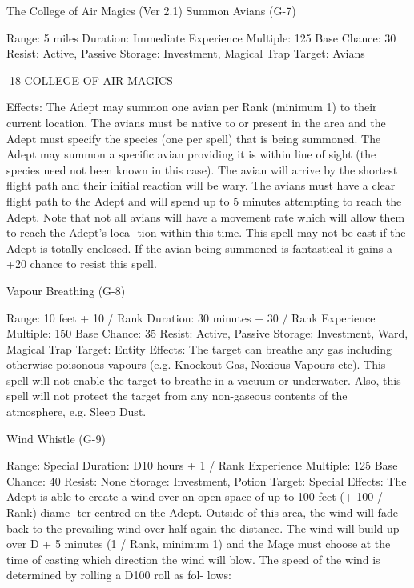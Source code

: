 \begin{Chapter}{The College of Air Magics (Ver 2.1)}
Summon Avians (G-7) 

Range: 5 miles 
Duration: Immediate 
Experience Multiple: 125 
Base Chance: 30%
Resist: Active, Passive 
Storage: Investment, Magical Trap 
Target: Avians 

18 COLLEGE OF AIR MAGICS 

Effects:  The  Adept  may  summon  one  avian  per 
Rank  (minimum  1)  to  their  current  location.  The 
avians must be native to or present in the area and 
the  Adept  must  specify  the  species  (one  per  spell) 
that is being summoned. The Adept may summon a 
specific  avian  providing  it  is  within  line  of  sight 
(the species need not been known in this case). The 
avian  will  arrive  by  the  shortest  flight  path  and 
their initial reaction will be wary. The avians must 
have a clear flight path to the Adept and will spend 
up  to  5  minutes  attempting  to  reach  the  Adept. 
Note that not all avians will have a movement rate 
which  will  allow  them  to  reach  the  Adept’s  loca-
tion within this time. This spell may  not be cast if 
the  Adept  is  totally  enclosed.  If  the  avian  being 
summoned is fantastical it gains a +20%
chance to resist this spell. 

Vapour Breathing (G-8) 

Range: 10 feet + 10 / Rank 
Duration: 30 minutes + 30 / Rank 
Experience Multiple: 150 
Base Chance: 35%
Resist: Active, Passive 
Storage: Investment, Ward, Magical Trap 
Target: Entity 
Effects:  The  target  can  breathe  any  gas  including 
otherwise  poisonous  vapours  (e.g.  Knockout  Gas, 
Noxious  Vapours  etc).  This  spell  will  not  enable 
the  target  to  breathe  in  a  vacuum  or  underwater. 
Also, this spell will not protect the target from any 
non-gaseous contents of the atmosphere, e.g. Sleep 
Dust. 

Wind Whistle (G-9) 

Range: Special 
Duration: D10 hours + 1 / Rank 
Experience Multiple: 125 
Base Chance: 40%
Resist: None 
Storage: Investment, Potion 
Target: Special 
Effects: The Adept is able to create a wind over an 
open space of up to 100 feet (+ 100 / Rank) diame-
ter  centred  on  the  Adept.  Outside  of  this  area,  the 
wind  will  fade  back  to  the  prevailing  wind  over 
half again the distance. The wind will build up over 
D  +  5  minutes  (1  /  Rank,  minimum  1)  and  the 
Mage  must  choose  at  the  time  of  casting  which 
direction  the  wind  will  blow.  The  speed  of  the 
wind  is  determined  by  rolling  a  D100  roll  as  fol-
lows: 


\end{Chapter}

